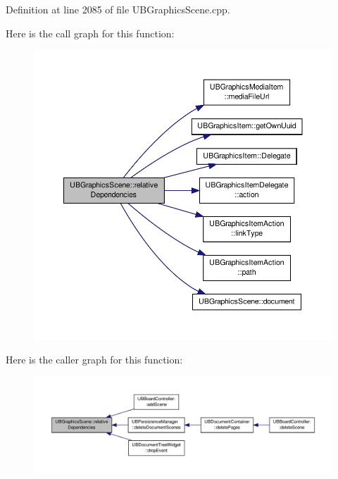 Definition at line 2085 of file U\-B\-Graphics\-Scene.\-cpp.



Here is the call graph for this function\-:
\nopagebreak
\begin{figure}[H]
\begin{center}
\leavevmode
\includegraphics[width=350pt]{dc/db2/class_u_b_graphics_scene_a601351bf55e81a30a79943a4080f5978_cgraph}
\end{center}
\end{figure}




Here is the caller graph for this function\-:
\nopagebreak
\begin{figure}[H]
\begin{center}
\leavevmode
\includegraphics[width=350pt]{dc/db2/class_u_b_graphics_scene_a601351bf55e81a30a79943a4080f5978_icgraph}
\end{center}
\end{figure}


